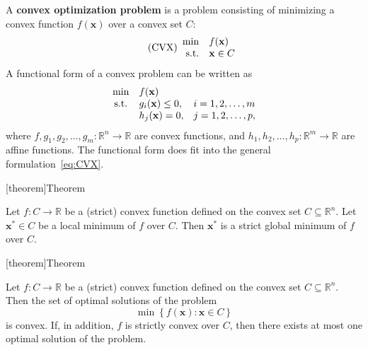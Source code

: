 \documentclass[12pt]{report}
\theoremstyle{definition}
\begin{document}
A \textbf{convex optimization problem} is a problem consisting of minimizing a
convex function $f(\mathbf{x})$ over a convex set $C$:
\begin{equation}\label{eq:CVX}
    \tag{CVX}
    \begin{array}{c @{\quad} l}
        \min & f(\mathbf{x}) \\
        \text{ s.t.} & \mathbf{x}\in C
    \end{array} 
\end{equation} 
A functional form of a convex problem can be written as
\begin{equation*}
    \begin{array}{c @{\quad} l @{\quad} l}
        \min & f(\mathbf{x}) & \\
        \text{s.t.} & g_i(\mathbf{x})\le 0, & i=1,2,\ldots,m \\
        & h_j(\mathbf{x})=0, & j=1,2,\ldots,p,
    \end{array} 
\end{equation*} 
where $f,g_1,g_2,\ldots,g_m:\mathbb{R}^{n}\rightarrow\mathbb{R}$ are convex
functions, and $h_1,h_2,\ldots,h_p:\mathbb{R}^{m}\rightarrow\mathbb{R}$
are affine functions.
The functional form does fit into the general formulation~\eqref{eq:CVX}.

[theorem]{Theorem}
\begin{local minima are global in CVX}
    Let $f:C\rightarrow\mathbb{R}$ be a (strict) convex function 
    defined on the convex set $C\subseteq\mathbb{R}^{n}$.
    Let $\mathbf{x}^*\in C$ be a local minimum of $f$ over $C$.
    Then $\mathbf{x}^*$ is a strict global minimum of $f$ over $C$.
\end{local minima are global in CVX}

[theorem]{Theorem}
\begin{CVX optimal solutions are convex}
    Let $f:C\rightarrow\mathbb{R}$ be a (strict) convex function 
    defined on the convex set $C\subseteq\mathbb{R}^{n}$.
    Then the set of optimal solutions of the problem
    \[
        \min{\left\{f(\mathbf{x}):\mathbf{x}\in C\right\}}
    \]
    is convex. If, in addition, $f$ is strictly convex over $C$, then there
    exists at most one optimal solution of the problem.
\end{CVX optimal solutions are convex}
\end{document}
